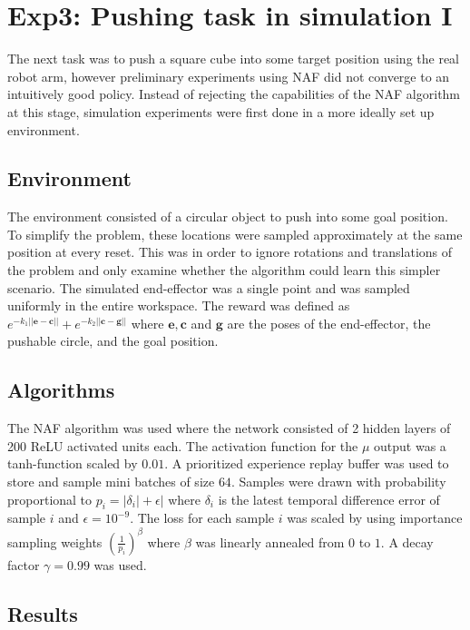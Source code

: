 \section{Exp3: Pushing task in simulation I}
\label{sec:push_sim_1}

The next task was to push a square cube into some target position using
the real robot arm, however preliminary experiments using NAF did not
converge to an intuitively good policy. Instead of rejecting the capabilities
of the NAF algorithm at this stage, simulation experiments were first done in
a more ideally set up environment.

\subsection{Environment}

The environment consisted of a circular object to push into some goal position.
To simplify the problem, these locations were sampled approximately at the same
position at every reset. This was in order to ignore rotations and translations
of the problem and only examine whether the algorithm could learn this simpler
scenario. The simulated end-effector was a single point and was sampled
uniformly in the entire workspace. The reward was defined as $e^{-k_1 ||\mathbf{e
- c}||} + e^{-k_2 ||\mathbf{c - g}||}$ where $\mathbf{e, c}$ and $\mathbf{g}$
are the poses of the end-effector, the pushable circle, and the goal
position.

\subsection{Algorithms}

The NAF algorithm was used where the network consisted of 2 hidden layers of
200 ReLU activated units each. The activation function for the $\mu$ output was
a tanh-function scaled by $0.01$. A prioritized experience replay buffer was
used to store and sample mini batches of size $64$. Samples were drawn with
probability proportional to $p_i = |\delta_i| + \epsilon|$ where $\delta_i$ is
the latest temporal difference error of sample $i$ and $\epsilon = 10^{-9}$.
The loss for each sample $i$ was scaled by using importance sampling weights
$\left( \frac{1}{p_i}\right) ^\beta$ where $\beta$ was linearly annealed from
$0$ to $1$. A decay factor $\gamma = 0.99$ was used.

\subsection{Results}

